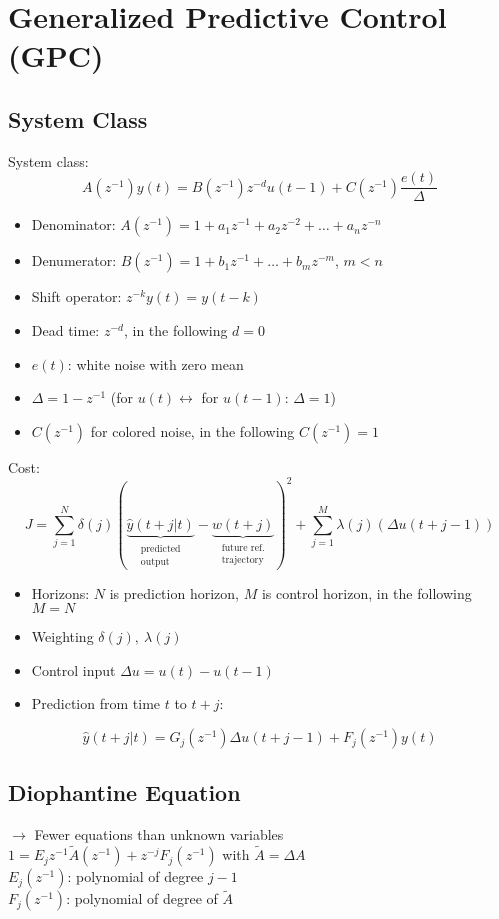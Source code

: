 \documentclass[english]{latex4ei/latex4ei_sheet}
\begin{document}
\section{Generalized Predictive Control (GPC)}
\begin{sectionbox}

\subsection{System Class}
System class:\\ 
$$A\left(z^{-1}\right) y(t)=B\left(z^{-1}\right) z^{-d} u(t-1)+C\left(z^{-1}\right) \frac{e(t)}{\Delta}$$
\begin{itemize}
    \item Denominator: $A\left(z^{-1}\right)=1+a_{1} z^{-1}+a_{2} z^{-2}+\ldots+a_{n} z^{-n}$
    \item Denumerator: $B\left(z^{-1}\right)=1+b_{1} z^{-1}+\ldots+b_{m} z^{-m}$, $m<n$
    \item Shift operator: $z^{-k} y(t)=y(t-k)$
    \item Dead time: $z^{-d}$, in the following $d=0$
    \item $e(t)$: white noise with zero mean
    \item $\Delta=1-z^{-1}$ (for $u(t) \leftrightarrow$ for $u(t-1)$: $\Delta=1$)
    \item $C\left(z^{-1}\right)$ for colored noise, in the following $C\left(z^{-1}\right)=1$
\end{itemize}
Cost: 
$$J=\sum_{j=1}^{N} \delta(j)(\underbrace{\hat{y}(t+j | t)}_{\substack{\text{predicted} \\ \text{output}}}-\underbrace{w(t+j)}_{\substack{\text{future ref.} \\ \text{trajectory}}})^{2}+\sum_{j=1}^{M} \lambda(j)(\Delta u(t+j-1))
$$
\begin{itemize}
    \item Horizons: $N$ is prediction horizon, $M$ is control horizon, in the following $M=N$
    \item Weighting $\delta(j),\ \lambda(j)$
    \item Control input $\Delta u = u(t)-u(t-1)$
    \item Prediction from time $t$ to $t+j$:
\end{itemize}
$$\hat{y}(t+j | t)=G_{j}(z^{-1})\Delta u(t+j-1)+F_{j}(z^{-1})y(t)
$$

\subsection{Diophantine Equation}
$\rightarrow$ Fewer equations than unknown variables\\
$1=E_{j} z^{-1} \tilde{A}\left(z^{-1}\right)+z^{-j} F_{j}\left(z^{-1}\right)$ with $\tilde{A}=\Delta A$ \\ $E_{j}\left(z^{-1}\right)$: polynomial of degree $j-1$ \\ $F_{j}\left(z^{-1}\right)$: polynomial of degree of $\tilde{A}$
\\ \\


\end{sectionbox}
\end{document}
